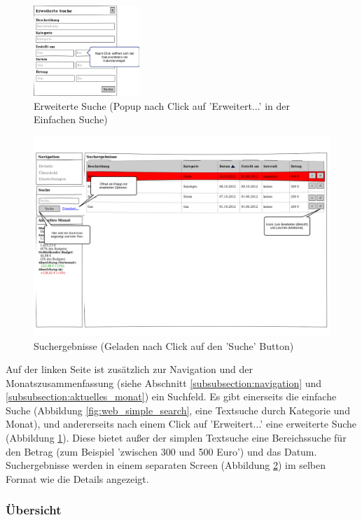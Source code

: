 \begin{figure}[htl]
\centering
\includegraphics[width=4cm]{img/web_advanced_search}
\caption{Erweiterte Suche (Popup nach Click auf 'Erweitert...' in der Einfachen Suche)}
\label{fig:web_advanced_search}
\end{figure}

\begin{figure}[htl]
\centering
\includegraphics[width=\textwidth]{img/web_search}
\caption{Suchergebnisse (Geladen nach Click auf den 'Suche' Button)}
\label{fig:web_search}
\end{figure}

Auf der linken Seite ist zusätzlich zur Navigation und der Monatszusammenfassung (siehe Abschnitt \ref{subsubsection:navigation} und \ref{subsubsection:aktuelles_monat}) ein Suchfeld. Es gibt einerseits die einfache Suche (Abbildung \ref{fig:web_simple_search}, eine Textsuche durch Kategorie und Monat), und andererseits nach einem Click auf
'Erweitert...' eine erweiterte Suche (Abbildung \ref{fig:web_advanced_search}). Diese bietet außer der simplen Textsuche eine Bereichssuche für den Betrag (zum Beispiel 'zwischen 300 und 500 Euro') und das Datum. Suchergebnisse werden in einem separaten Screen (Abbildung \ref{fig:web_search}) im selben Format wie die Details angezeigt.

\subsubsection{Übersicht}

